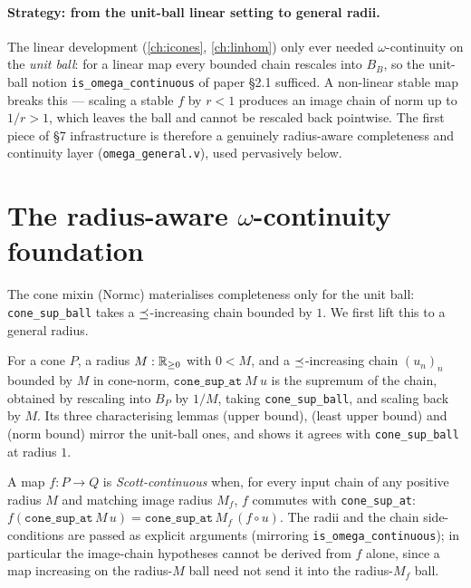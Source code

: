 \paragraph{Strategy: from the unit-ball linear setting to general radii.}
The linear development (\autoref{ch:icones}, \autoref{ch:linhom}) only
ever needed $\omega$-continuity on the \emph{unit ball}: for a linear
map every bounded chain rescales into $B_B$, so the unit-ball notion
\texttt{is\_omega\_continuous} of paper \S2.1 sufficed. A non-linear
stable map breaks this --- scaling a stable $f$ by $r < 1$ produces an
image chain of norm up to $1/r > 1$, which leaves the ball and cannot be
rescaled back pointwise. The first piece of \S7 infrastructure is
therefore a genuinely radius-aware completeness and continuity layer
(\texttt{omega\_general.v}), used pervasively below.

\section{The radius-aware \texorpdfstring{$\omega$}{omega}-continuity foundation}%
\label{sec:omega-general}

The cone mixin (Normc) materialises completeness only for the unit
ball: \texttt{cone\_sup\_ball} takes a $\preceq$-increasing chain bounded
by $1$. We first lift this to a general radius.

\begin{definition}\label{def:cone-sup-at}
\rocqok{}
For a cone $P$, a radius $M : \mathbb{R}_{\geq 0}$ with $0 < M$, and a
$\preceq$-increasing chain $(u_n)_n$ bounded by $M$ in cone-norm,
$\texttt{cone\_sup\_at}\ M\ u$ is the supremum of the chain, obtained by
rescaling into $B_P$ by $1/M$, taking \texttt{cone\_sup\_ball}, and
scaling back by $M$. Its three characterising lemmas
 (upper bound),
 (least upper bound)
and  (norm bound)
mirror the unit-ball ones, and
 shows it agrees with
\texttt{cone\_sup\_ball} at radius $1$.
\end{definition}

\begin{definition}\label{def:scott-cont}
\rocqok
{}
A map $f : P \to Q$ is \emph{Scott-continuous} when, for every input
chain of any positive radius $M$ and matching image radius $M_f$, $f$
commutes with \texttt{cone\_sup\_at}:
$f(\texttt{cone\_sup\_at}\,M\,u) = \texttt{cone\_sup\_at}\,M_f\,(f \circ
u)$. The radii and the chain side-conditions are passed as explicit
arguments (mirroring \texttt{is\_omega\_continuous}); in particular the
image-chain hypotheses cannot be derived from $f$ alone, since a map
increasing on the radius-$M$ ball need not send it into the radius-$M_f$
ball.
\end{definition}

